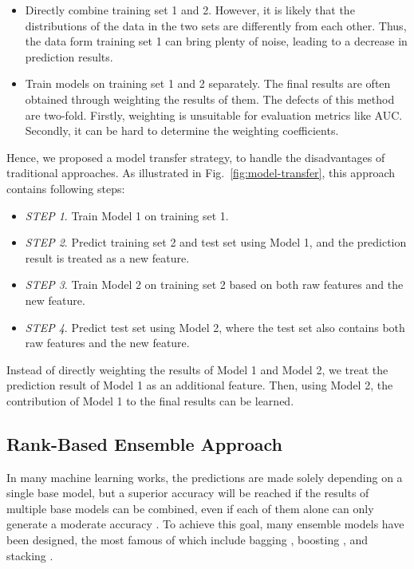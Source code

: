 \documentclass{article}
\begin{document}
\begin{itemize}
  \item
    Directly combine training set 1 and 2. However, it is likely that the distributions of the data in the two sets are differently from each other. Thus, the data form training set 1 can bring plenty of noise, leading to a decrease in prediction results.
  \item
    Train models on training set 1 and 2 separately. The final results are often obtained through weighting the results of them. The defects of this method are two-fold. Firstly, weighting is unsuitable for evaluation metrics like AUC. Secondly, it can be hard to determine the weighting coefficients.
\end{itemize}

Hence, we proposed a model transfer strategy, to handle the disadvantages of traditional approaches. As illustrated in Fig.~\ref{fig:model-transfer}, this approach contains following steps:

\begin{itemize}
\item
  \emph{STEP 1}. Train Model 1 on training set 1.
\item
  \emph{STEP 2}. Predict training set 2 and test set using Model 1, and the prediction result is treated as a new feature.
\item
  \emph{STEP 3}. Train Model 2 on training set 2 based on both raw features and the new feature.
\item
  \emph{STEP 4}. Predict test set using Model 2, where the test set also contains both raw features and the new feature.
\end{itemize}

Instead of directly weighting the results of Model 1 and Model 2, we
treat the prediction result of Model 1 as an additional feature. Then,
using Model 2, the contribution of Model 1 to the final results can be
learned.


\subsection{Rank-Based Ensemble Approach}
\label{sec:rank-based-ensemble-approach}

In many machine learning works, the predictions are made solely depending on a single base model, but a superior accuracy will be reached if the results of multiple base models can be combined, even if each of them alone can only generate a moderate accuracy \cite{dietterich_ensemble_2000}. To achieve this goal, many ensemble models have been designed, the most famous of which include bagging \cite{breiman_bagging_1996}, boosting \cite{drucker_improving_1997}, and stacking \cite{wolpert_stacked_1992}.
\end{document}

